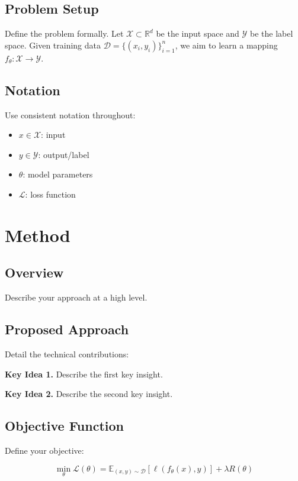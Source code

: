\documentclass{article}
\begin{document}
\subsection{Problem Setup}

Define the problem formally. Let $\mathcal{X} \subset \mathbb{R}^d$ be the input space
and $\mathcal{Y}$ be the label space. Given training data
$\mathcal{D} = \{(x_i, y_i)\}_{i=1}^n$, we aim to learn a mapping
$f_\theta: \mathcal{X} \rightarrow \mathcal{Y}$.

\subsection{Notation}

Use consistent notation throughout:
\begin{itemize}
    \item $x \in \mathcal{X}$: input
    \item $y \in \mathcal{Y}$: output/label
    \item $\theta$: model parameters
    \item $\mathcal{L}$: loss function
\end{itemize}

\section{Method}
\label{sec:method}

\subsection{Overview}

Describe your approach at a high level.

\subsection{Proposed Approach}

Detail the technical contributions:

\textbf{Key Idea 1.} Describe the first key insight.

\textbf{Key Idea 2.} Describe the second key insight.

\subsection{Objective Function}

Define your objective:

\begin{equation}
    \min_{\theta} \mathcal{L}(\theta) = \mathbb{E}_{(x,y) \sim \mathcal{D}}
    \left[ \ell(f_\theta(x), y) \right] + \lambda R(\theta)
    \label{eq:objective}
\end{equation}
\end{document}
